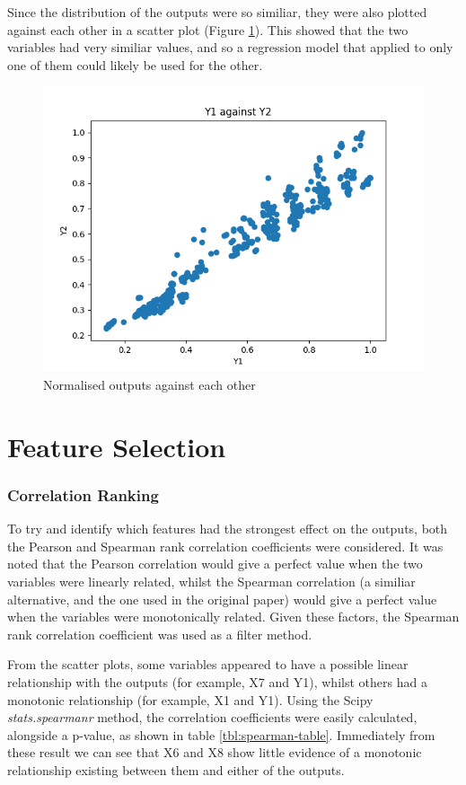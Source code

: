 \documentclass[12pt]{article}
\begin{document}
\FloatBarrier

Since the distribution of the outputs were so similiar, they were also plotted against each other in a scatter plot (Figure \ref{fig:y1vsy2}). This showed that the two variables had very similiar values, and so a regression model that applied to only one of them could likely be used for the other.

\begin{figure}[!ht]
\centering
\includegraphics[width=0.8 \linewidth]{images/Y1vsY2}
\caption{Normalised outputs against each other}
\label{fig:y1vsy2}
\end{figure}

\FloatBarrier

\part{Feature Selection}

\section{Correlation Ranking}

To try and identify which features had the strongest effect on the outputs, both the Pearson and Spearman rank correlation coefficients were considered. It was noted that the Pearson correlation would give a perfect value when the two variables were linearly related, whilst the Spearman correlation (a similiar alternative, and the one used in the original paper) would give a perfect value when the variables were monotonically related. Given these factors, the Spearman rank correlation coefficient was used as a filter method.

From the scatter plots, some variables appeared to have a possible linear relationship with the outputs (for example, X7 and Y1), whilst others had a monotonic relationship (for example, X1 and Y1). Using the Scipy \emph{stats.spearmanr} method, the correlation coefficients were easily calculated, alongside a p-value, as shown in table \ref{tbl:spearman-table}. Immediately from these result we can see that X6 and X8 show little evidence of a monotonic relationship existing between them and either of the outputs. 
\end{document}
